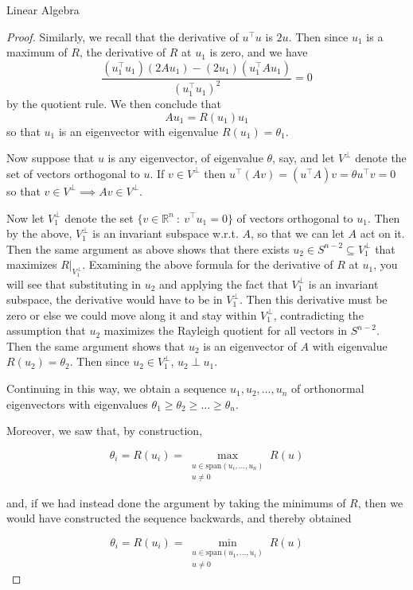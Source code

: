 \documentclass{article}
\newcommand{\R}{\mathbb R}
\begin{document}
\begin{section}{Linear Algebra}
\begin{proof}
    Similarly, we recall that the derivative of $u^\intercal u$ is $2u$.
    Then since $u_1$ is a maximum of $R$, the derivative of $R$ at $u_1$ is zero, and we have
    $$
    \frac{(u_1^\intercal u_1)(2Au_1) - (2u_1)(u_1^\intercal A u_1)}{(u_1^\intercal u_1)^2} = 0
    $$
    by the quotient rule.
    We then conclude that
    $$
    Au_1 = R(u_1)u_1 
    $$
    so that $u_1$ is an eigenvector with eigenvalue $R(u_1) = \theta_1$.

    Now suppose that $u$ is any eigenvector, of eigenvalue $\theta$, say, and let $V^\perp$ denote the set of vectors orthogonal to $u$.
    If $v \in V^\perp$ then $u^\intercal(Av) = (u^\intercal A)v = \theta u^\intercal v = 0$ so that $v \in V^\perp \implies Av \in V^\perp$.

    Now let $V_1^\perp$ denote the set $\{v \in \R^n~:~v^\intercal u_1 = 0\}$ of vectors orthogonal to $u_1$.
    Then by the above, $V_1^\perp$ is an invariant subspace w.r.t. $A$, so that we can let $A$ act on it.
    Then the same argument as above shows that there exists $u_2 \in S^{n-2} \subseteq V_1^\perp$ that maximizes $R|_{V_1^\perp}$.
    Examining the above formula for the derivative of $R$ at $u_1$, you will see that substituting in $u_2$ and applying the fact that $V_1^\perp$ is an invariant subspace,
    the derivative would have to be in $V_1^\perp$.
    Then this derivative must be zero or else we could move along it and stay within $V_1^\perp$, contradicting the assumption that $u_2$ maximizes the Rayleigh quotient for all
    vectors in $S^{n-2}$.
    Then the same argument shows that $u_2$ is an eigenvector of $A$ with eigenvalue $R(u_2) = \theta_2$.
    Then since $u_2 \in V_1^\perp$, $u_2 \perp u_1$.
    
    Continuing in this way, we obtain a sequence $u_1, u_2, \ldots, u_n$ of orthonormal eigenvectors with eigenvalues $\theta_1 \geq \theta_2 \geq \ldots \geq \theta_n$.

    Moreover, we saw that, by construction,

    $$
    \theta_i = R(u_i) = \max_{\substack{u \in \text{span}(u_i, \ldots, u_n) \\ u \neq 0}}R(u)
    $$

    and, if we had instead done the argument by taking the minimums of $R$, then we would have constructed the sequence backwards, and thereby obtained

    $$
    \theta_i = R(u_i) = \min_{\substack{u \in \text{span}(u_1, \ldots, u_i) \\ u \neq 0}}R(u)
    $$


\end{proof}
\end{section}
\end{document}
